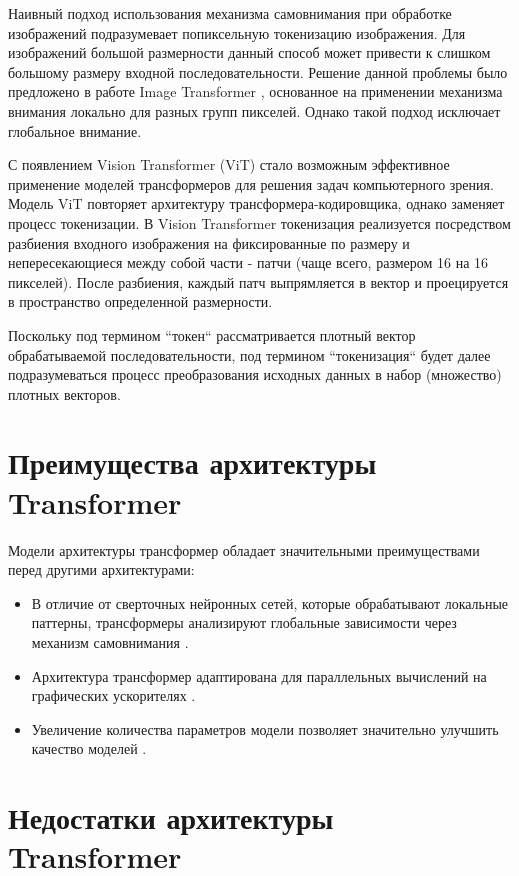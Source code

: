 \documentclass[times,specification,annotation]{itmo-student-thesis}
\begin{document}
Наивный подход использования механизма самовнимания при обработке изображений подразумевает попиксельную токенизацию изображения. Для изображений большой размерности данный способ может привести к слишком большому размеру входной последовательности. Решение данной проблемы было предложено в работе Image Transformer \cite{image_transformer}, основанное на применении механизма внимания локально для разных групп пикселей. Однако такой подход исключает глобальное внимание.

С появлением Vision Transformer (ViT) \cite{vit} стало возможным эффективное применение моделей трансформеров для решения задач компьютерного зрения. Модель ViT повторяет архитектуру трансформера-кодировщика, однако заменяет процесс токенизации. В Vision Transformer токенизация реализуется посредством разбиения входного изображения на фиксированные по размеру и непересекающиеся между собой части - патчи (чаще всего, размером 16 на 16 пикселей). После разбиения, каждый патч выпрямляется в вектор и проецируется в пространство определенной размерности. 

Поскольку под термином ``токен`` рассматривается плотный вектор обрабатываемой последовательности, под термином ``токенизация`` будет далее подразумеваться процесс преобразования исходных данных в набор (множество) плотных векторов.

\section{Преимущества архитектуры Transformer}

Модели архитектуры трансформер обладает значительными преимуществами перед другими архитектурами:

\begin{itemize}
    \item В отличие от сверточных нейронных сетей, которые обрабатывают локальные паттерны, трансформеры анализируют глобальные зависимости через механизм самовнимания \cite{transformer}.
    \item Архитектура трансформер адаптирована для параллельных вычислений на графических ускорителях \cite{transformer}.
    \item Увеличение количества параметров модели позволяет значительно улучшить качество моделей \cite{gpt2}.
\end{itemize}

\section{Недостатки архитектуры Transformer}
\end{document}

